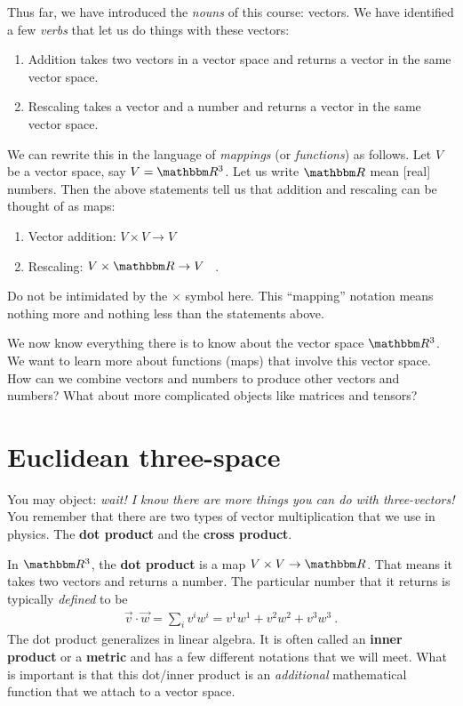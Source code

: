 \documentclass[12pt, oneside]{report}    %
\let\oldsection\section
\def\section{%
  \setcounter{sidenote}{1}%
  \oldsection
}
\begin{document}
Thus far, we have introduced the \emph{nouns} of this course: vectors. We have identified a few \emph{verbs} that let us do things with these vectors:
\begin{enumerate}
    \item Addition takes two vectors in a vector space and returns a vector in the same vector space. 
    \item Rescaling takes a vector and a number and returns a vector in the same vector space.
\end{enumerate}
We can rewrite this in the language of \emph{mappings} (or \emph{functions}) as follows. Let $V$ be a vector space, say $V=\RR ^3$. Let us write $\RR $ mean [real] numbers. Then the above statements tell us that addition and rescaling can be thought of as maps:
\begin{enumerate}
    \item Vector addition: $V\times V \to V$
    \item Rescaling: $V\times \RR  \to V$ \ .
\end{enumerate}
Do not be intimidated by the $\times$ symbol here. This ``mapping'' notation means nothing more and nothing less than the statements above.

We now know everything there is to know about the vector space $\RR ^3$. We want to learn more about functions (maps) that involve this vector space. How can we combine vectors and numbers to produce other vectors and numbers? What about more complicated objects like matrices and tensors? 

\section{Euclidean three-space}

You may object: \emph{wait! I know there are more things you can do with three-vectors!} You remember that there are two types of vector multiplication that we use in physics. The \textbf{dot product} and the \textbf{cross product}. 

In $\RR ^3$, the \textbf{dot product} is a map $V\times V \to \RR $. That means it takes two vectors and returns a number. The particular number that it returns is typically \emph{defined} to be
\begin{align}
    \vec{v} \cdot \vec{w} 
    = \sum_i v^i w^i  
    = v^1w^1 + v^2 w^2 + v^3w^3 \ .
    \label{eq:euclidean:3d:metric:intro}
\end{align}
The dot product generalizes in linear algebra. It is often called an \textbf{inner product} or a \textbf{metric} and has a few different notations that we will meet. What is important is that this dot/inner product is an \emph{additional} mathematical function that we attach to a vector space. 
\end{document}
